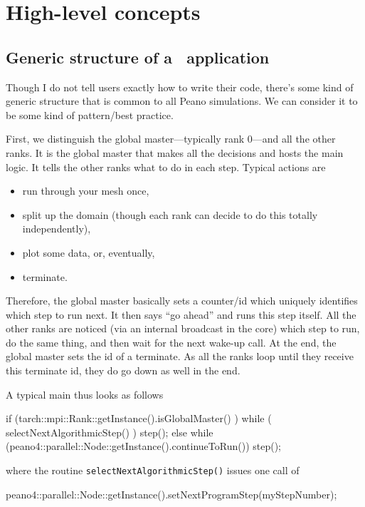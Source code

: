 \chapter{High-level concepts}


\section{Generic structure of a \Peano\  application}

Though I do not tell users exactly how to write their code, there's some kind of
generic structure that is common to all Peano simulations.
We can consider it to be some kind of pattern/best practice.


First, we distinguish the global master---typically rank 0---and all the other
ranks.
It is the global master that makes all the decisions and hosts the main logic.
It tells the other ranks what to do in each step. 
Typical actions are
\begin{itemize}
  \item run through your mesh once,
  \item split up the domain (though each rank can decide to do this totally
  independently),
  \item plot some data, or, eventually,
  \item terminate.
\end{itemize}


Therefore, the global master basically sets a counter/id which uniquely
identifies which step to run next.
It then says ``go ahead'' and runs this step itself.
All the other ranks are noticed (via an internal broadcast in the core) which
step to run, do the same thing, and then wait for the next wake-up call.
At the end, the global master sets the id of a terminate.
As all the ranks loop until they receive this terminate id, they do go down as
well in the end.


A typical main thus looks as follows
\begin{code}
  if (tarch::mpi::Rank::getInstance().isGlobalMaster() ) {
    while ( selectNextAlgorithmicStep() ) {
      step();
    }
  }
  else {
    while (peano4::parallel::Node::getInstance().continueToRun()) {
      step();
    }
  }
\end{code}


\noindent
where the routine \texttt{selectNextAlgorithmicStep()} issues one call of
\begin{code}
peano4::parallel::Node::getInstance().setNextProgramStep(myStepNumber);
\end{code}

